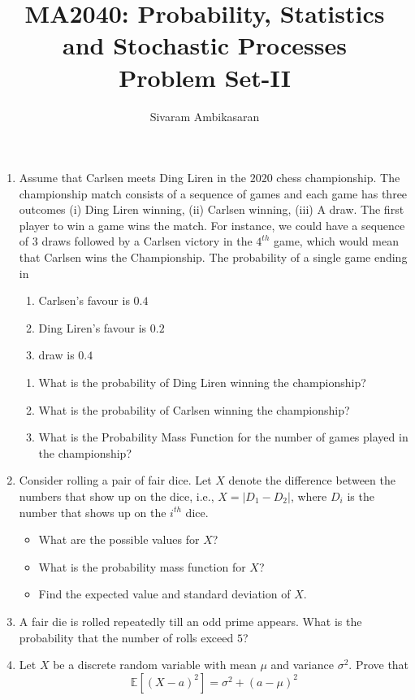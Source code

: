 \documentclass{article}
\title{MA2040: Probability, Statistics and Stochastic Processes\\
Problem Set-II}
\author{Sivaram Ambikasaran}
\newcommand{\abs}[1]{\displaystyle\left\lvert#1\right\rvert}
\newcommand{\bkt}[1]{\left(#1\right)}
\begin{document}
	\maketitle
	\begin{enumerate}
		\item
		Assume that Carlsen meets Ding Liren in the $2020$ chess championship. The championship match consists of a sequence of games and each game has three outcomes (i) Ding Liren winning, (ii) Carlsen winning, (iii) A draw. The first player to win a game wins the match. For instance, we could have a sequence of $3$ draws followed by a Carlsen victory in the $4^{th}$ game, which would mean that Carlsen wins the Championship. The probability of a single game ending in
		\begin{enumerate}
			\item
			Carlsen's favour is $0.4$
			\item
			Ding Liren's favour is $0.2$
			\item
			draw is $0.4$
		\end{enumerate}
		\begin{enumerate}[i]
			\item
			What is the probability of Ding Liren winning the championship?
			\item
			What is the probability of Carlsen winning the championship?
			\item
			What is the Probability Mass Function for the number of games played in the championship?
		\end{enumerate}
		\item
		Consider rolling a pair of fair dice. Let $X$ denote the difference between the numbers that show up on the dice, i.e., $X = \abs{D_1-D_2}$, where $D_i$ is the number that shows up on the $i^{th}$ dice.
		\begin{itemize}
			\item
			What are the possible values for $X$?
			\item
			What is the probability mass function for $X$?
			\item
			Find the expected value and standard deviation of $X$.
		\end{itemize}
		\item
		A fair die is rolled repeatedly till an odd prime appears. What is the probability that the number of rolls exceed $5$?
		\item
		Let $X$ be a discrete random variable with mean $\mu$ and variance $\sigma^2$. Prove that
		$$\mathbb{E}\left[\bkt{X-a}^2\right] = \sigma^2 + \bkt{a-\mu}^2$$

\end{enumerate}
\end{document}
